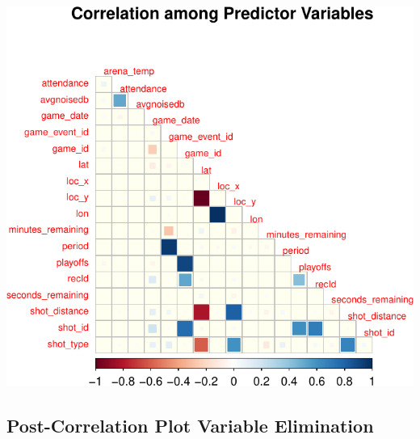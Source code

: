 \documentclass[]{article}
\begin{document}
\includegraphics{Final_Project_Applied_files/figure-latex/Multicollinearity-1.pdf}

\hypertarget{post-correlation-plot-variable-elimination}{%
\subsection{\texorpdfstring{\textbf{Post-Correlation Plot Variable
Elimination}}{Post-Correlation Plot Variable Elimination}}\label{post-correlation-plot-variable-elimination}}
\end{document}
